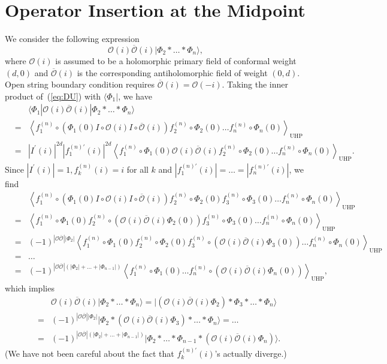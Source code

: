 \documentclass[a4paper,12pt]{article}
\newcommand{\cO}{\mathcal{O}}
\newcommand{\sectiono}[1]{\section{#1}\setcounter{equation}{0}}
\begin{document}
\sectiono{Operator Insertion at the Midpoint}\label{sec:appB}
We consider the following expression 
\begin{equation}
\cO(i)\overline{\cO}(i)|\Phi_2*\ldots *\Phi_n\rangle, \label{eq:DU}
\end{equation}
where $\cO(i)$ is assumed to be a holomorphic primary field of conformal weight $(d,0)$ and 
$\overline{\cO}(i)$ is the corresponding antiholomorphic field of weight $(0,d)$. Open string 
boundary condition requires $\overline{\cO}(i)=\cO(-i)$. Taking the inner product of~(\ref{eq:DU}) 
with $\langle\Phi_1|$, we have 
\begin{eqnarray}
& &\langle\Phi_1|\cO(i)\overline{\cO}(i)|\Phi_2*\ldots *\Phi_n\rangle \nonumber \\
&=&\left\langle f_1^{(n)}\circ
\left(\Phi_1(0)I\circ\cO(i)I\circ\overline{\cO}(i)\right)f_2^{(n)}\circ\Phi_2(0)\ldots
f_n^{(n)}\circ\Phi_n(0)\right\rangle_{\mathrm{UHP}} \nonumber \\
&=&|I^{\prime}(i)|^{2d}|f^{(n)\prime}_1(i)|^{2d}\left\langle f_1^{(n)}\circ\Phi_1(0)
\cO(i)\overline{\cO}(i)f_2^{(n)}\circ\Phi_2(0)\ldots f_n^{(n)}\circ\Phi_n(0)\right\rangle_{\mathrm{UHP}}.
\label{eq:DV}
\end{eqnarray}
Since $|I^{\prime}(i)|=1, f^{(n)}_k(i)=i$ for all $k$ and $|f_1^{(n)\prime}(i)|=\ldots =|f_n^{(n)\prime}
(i)|$, we find 
\begin{eqnarray*}
& &\left\langle f_1^{(n)}\circ\left(\Phi_1(0)I\circ\cO(i)I\circ\overline{\cO}(i)\right)f_2^{(n)}
\circ\Phi_2(0)f_3^{(n)}\circ\Phi_3(0)\ldots f_n^{(n)}\circ\Phi_n(0)\right\rangle_{\mathrm{UHP}} \\
&=&\left\langle f_1^{(n)}\circ\Phi_1(0)f_2^{(n)}\circ\left(\cO(i)\overline{\cO}(i)\Phi_2(0)\right)
f_3^{(n)}\circ\Phi_3(0)\ldots f_n^{(n)}\circ\Phi_n(0)\right\rangle_{\mathrm{UHP}} \\
&=&(-1)^{|\cO\overline{\cO}||\Phi_2|}\left\langle f_1^{(n)}\circ\Phi_1(0)f_2^{(n)}\circ\Phi_2(0)
f_3^{(n)}\circ\left(\cO(i)\overline{\cO}(i)\Phi_3(0)\right)\ldots f_n^{(n)}\circ\Phi_n(0)
\right\rangle_{\mathrm{UHP}} \\
&=&\ldots \\
&=&(-1)^{|\cO\overline{\cO}|(|\Phi_2|+\ldots+|\Phi_{n-1}|)}\left\langle f_1^{(n)}\circ\Phi_1(0)
\ldots f_n^{(n)}\circ\left(\cO(i)\overline{\cO}(i)\Phi_n(0)\right)\right\rangle_{\mathrm{UHP}}, 
\end{eqnarray*}
which implies 
\begin{eqnarray}
& &\cO(i)\overline{\cO}(i)|\Phi_2*\ldots *\Phi_n\rangle=\Big|\left(\cO(i)\overline{\cO}(i)\Phi_2\right)
*\Phi_3*\ldots *\Phi_n\Bigr\rangle \nonumber \\
&=&(-1)^{|\cO\overline{\cO}||\Phi_2|}\Big|\Phi_2*\left(\cO(i)\overline{\cO}(i)\Phi_3\right)*\ldots *
\Phi_n\Bigr\rangle=\ldots \label{eq:DW} \\
&=&(-1)^{|\cO\overline{\cO}|(|\Phi_2|+\ldots+|\Phi_{n-1}|)}\Big|\Phi_2*\ldots *\Phi_{n-1}*
\left(\cO(i)\overline{\cO}(i)\Phi_n\right)\Bigr\rangle. \nonumber 
\end{eqnarray}
(We have not been careful about the fact that $f^{(n)\prime}_k(i)$'s actually diverge.) 
\end{document}
